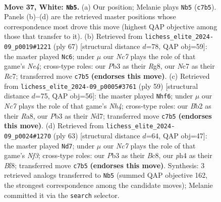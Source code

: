 \documentclass[11pt]{article}
\begin{document}
\clearpage

\begin{figure}[p]\centering
\begin{subfigure}{0.46\textwidth}\centering
\resizebox{\linewidth}{!}{%
\newchessgame
\chessboard[
  setfen={1nb2k2/1pN5/1n1r1p2/p2p2p1/1b4Pp/1P2P2P/PB2PK2/2RB4 w - - 8 37},
  showmover=false,
  pgfstyle=straightmove, color=movearrow, markmove={c7-b5}
]}
\caption{}
\end{subfigure}\hfill
\begin{subfigure}{0.46\textwidth}\centering
\resizebox{\linewidth}{!}{%
\newchessgame
\chessboard[
  setfen={6r1/1pr2b2/p2p1p1k/4nB1p/1PP1P3/3P1p1N/3R3P/R6K b - - 0 34},
  showmover=false,
  pgfstyle=straightmove, color=movearrow, markmove={e5-c6}
]}
\caption{}
\end{subfigure}
\\[4pt]
\begin{subfigure}{0.46\textwidth}\centering
\resizebox{\linewidth}{!}{%
\newchessgame
\chessboard[
  setfen={r7/1p1n1kpp/2pBb3/3p1p1n/P4P2/1P4PP/2P1N1BK/4R3 b - - 3 30},
  showmover=false,
  pgfstyle=straightmove, color=movearrow, markmove={h5-f6}
]}
\caption{}
\end{subfigure}\hfill
\begin{subfigure}{0.46\textwidth}\centering
\resizebox{\linewidth}{!}{%
\newchessgame
\chessboard[
  setfen={2b2b2/1pp2k2/3p1np1/1P1Pp3/2P1P1p1/3BB1N1/r4PP1/3R2K1 b - - 4 32},
  showmover=false,
  pgfstyle=straightmove, color=movearrow, markmove={f6-d7}
]}
\caption{}
\end{subfigure}
\caption{\textbf{Move 37, White: \texttt{Nb5}.} (a) Our position; Melanie plays \texttt{Nb5} (\texttt{c7b5}). Panels (b)--(d) are the retrieved master positions whose correspondence most drove this move (highest QAP objective among those that transfer to it). (b) Retrieved from \texttt{lichess\_elite\_2024-09\_p0019\#1221} (ply 67) [structural distance $d$=78, QAP obj=59]: the master played \texttt{Nc6}; under $\mu$ our \emph{Nc7} plays the role of that game's \emph{Ne4}; cross-type roles: our \emph{P}b3 as their \emph{R}g8, our \emph{N}c7 as their \emph{R}c7; transferred move \texttt{c7b5} \textbf{(endorses this move)}. (c) Retrieved from \texttt{lichess\_elite\_2024-09\_p0005\#3761} (ply 59) [structural distance $d$=75, QAP obj=56]: the master played \texttt{Nhf6}; under $\mu$ our \emph{Nc7} plays the role of that game's \emph{Nh4}; cross-type roles: our \emph{B}b2 as their \emph{R}a8, our \emph{P}b3 as their \emph{N}d7; transferred move \texttt{c7b5} \textbf{(endorses this move)}. (d) Retrieved from \texttt{lichess\_elite\_2024-09\_p0024\#1270} (ply 63) [structural distance $d$=64, QAP obj=47]: the master played \texttt{Nd7}; under $\mu$ our \emph{Nc7} plays the role of that game's \emph{Nf3}; cross-type roles: our \emph{P}b3 as their \emph{B}c8, our \emph{p}h4 as their \emph{B}f8; transferred move \texttt{c7b5} \textbf{(endorses this move)}. Synthesis: 3 retrieved analogs transferred to \texttt{Nb5} (summed QAP objective 162, the strongest correspondence among the candidate moves); Melanie committed it via the \texttt{search} selector.}
\label{fig:thought-m72}
\end{figure}
\end{document}

